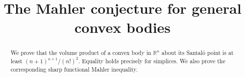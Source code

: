 \documentclass[11pt,a4paper]{amsart}
\title{The Mahler conjecture for general convex bodies}
\author{}
\date{}
\begin{document}
\begin{abstract}
We prove that the volume product of a convex body in $\mathbb{R}^n$ about its Santal\'o point is at least $(n+1)^{n+1}/(n!)^2$. Equality holds precisely for simplices. We also prove the corresponding sharp functional Mahler inequality.
\end{abstract}

\maketitle


\tableofcontents







\appendix



\printbibliography
\end{document}
